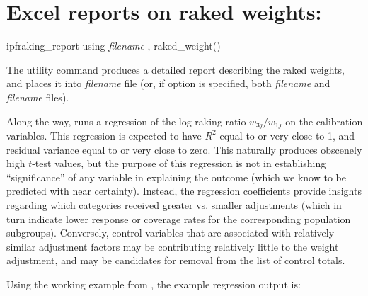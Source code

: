 \section{Excel reports on raked weights:  }

\begin{stsyntax}
ipfraking\_report
using \textit{filename}
,
raked\_weight(\varname)
\end{stsyntax}

The utility command  produces a detailed report
describing the raked weights, and places it into \textit{filename} file
(or, if  option is specified, both \textit{filename} and \textit{filename}
files).

Along the way,  runs a regression of the log raking ratio $w_{3j}/w_{1j}$
on the calibration variables. This regression is expected to have $R^2$ equal to or very close to 1,
and residual variance equal to or very close to zero. This naturally produces obscenely
high $t$-test values, but the purpose of this regression is not in establishing
``significance'' of any variable in explaining the outcome (which we know to be predicted
with near certainty).
Instead, the regression coefficients provide insights regarding which categories received
greater vs. smaller adjustments (which in turn indicate lower response or coverage rates
for the corresponding population subgroups). Conversely, control variables that are
associated with relatively similar adjustment factors may be contributing relatively
little to the weight adjustment, and may be candidates for removal from the list of control totals.

Using the working example from \citet{kolenikov:2014}, the example regression output is:

\begin{stlog}
\nullskip
\end{stlog}

